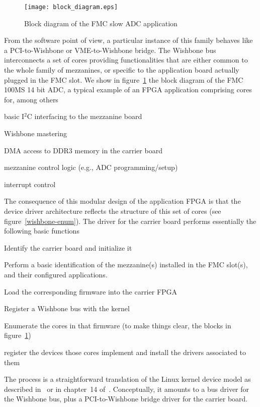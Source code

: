 \documentclass{JAC2003}
\begin{document}
\begin{figure}[tb]
   \centering
   \texttt{[image: block\_diagram.eps]}
   \caption{Block diagram of the FMC slow ADC application}
   \label{slow-adc}
\end{figure}

From the software
point of view, a particular instance of this family behaves like a
PCI-to-Wishbone or VME-to-Wishbone bridge. The Wishbone bus
interconnects a set of cores providing functionalities that are either
common to the whole family of mezzanines, or specific to the application
board actually plugged in the FMC slot. We show in figure~\ref{slow-adc}
the block diagram of the FMC 100MS 14 bit ADC,
a typical example of an FPGA application comprising cores for, among
others
\begin{Itemize}
\item basic I${}^2$C interfacing to the mezzanine board
\item Wishbone mastering
\item DMA access to DDR3 memory in the carrier board
\item mezzanine control logic (e.g., ADC programming/setup)
\item interrupt control
\end{Itemize}
The consequence of this modular design of the application FPGA is that
the device driver architecture reflects the structure of this set of
cores (see figure~\ref{wishbone-enum}). The driver for the carrier board
performs essentially the following basic functions
\begin{Itemize}
\item Identify the carrier board and initialize it
\item Perform a basic identification of the mezzanine(s) installed in
    the FMC slot(s), and their configured applications.
\item Load the corresponding firmware into the carrier FPGA
\item Register a Wishbone bus with the kernel
\item Enumerate the cores in that firmware (to make things clear, the
    blocks in figure~\ref{slow-adc})
\item register the devices those cores implement and install the drivers 
    associated to them
\end{Itemize}
The process is a straightforward translation of the Linux kernel device
model as described in~\cite{device-model} or in chapter~14
of~\cite{rubini}. Conceptually, it amounts to a bus driver for the
Wishbone bus, plus a PCI-to-Wishbone bridge driver for the carrier
board.
\end{document}
